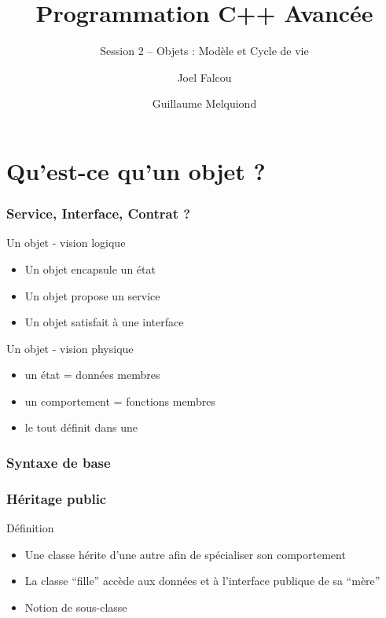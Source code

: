 \documentclass[svgnames]{beamer}
\title{Programmation C++ Avancée}
\subtitle{Session 2 -- Objets : Modèle et Cycle de vie}
\author{Joel Falcou \and Guillaume Melquiond}
\institute{Laboratoire de Recherche en Informatique}
\date{}
\begin{document}


\begin{frame}[plain]
\titlepage
\end{frame}
\setcounter{framenumber}{0}

\section{Qu'est-ce qu'un objet ?}

\frame
{
  \frametitle{Service, Interface, Contrat ?}
  \begin{block}{Un objet - vision logique}
  \begin{itemize}
  \item Un objet encapsule un état
  \item Un objet propose un service
  \item Un objet satisfait à une interface
  \end{itemize}
  \end{block}{}
  
  \begin{block}{Un objet - vision physique}
  \begin{itemize}
  \item un état = données membres
  \item un comportement = fonctions membres
  \item le tout définit dans une 
  \end{itemize}
  \end{block}{}
}

\frame
{
  \frametitle{Syntaxe de base}
}
 
\frame
{
  \frametitle{Héritage public}
  \begin{block}{Définition}
  \begin{itemize}
  \footnotesize
  \item Une classe hérite d'une autre afin de spécialiser son comportement
  \item La classe ``fille'' accède aux données et à l'interface publique de sa ``mère''
  \item Notion de sous-classe
  \end{itemize}

  \begin{overlayarea}{\textwidth}{4cm}
  \end{overlayarea}
  \end{block}
}
\end{document}
